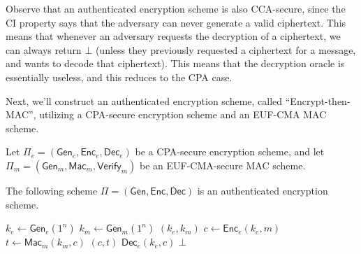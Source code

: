 \documentclass[12pt]{tufte-book}
\begin{document}
Observe that an authenticated encryption scheme is also CCA-secure, since the CI property says that the adversary can never generate a valid ciphertext. This means that whenever an adversary requests the decryption of a ciphertext, we can always return $\bot$ (unless they previously requested a ciphertext for a message, and wants to decode that ciphertext). This means that the decryption oracle is essentially useless, and this reduces to the CPA case.

Next, we'll construct an authenticated encryption scheme, called ``Encrypt-then-MAC'', utilizing a CPA-secure encryption scheme and an EUF-CMA MAC scheme.

\begin{claim}
    Let $\Pi_e = (\mathsf{Gen}_e, \mathsf{Enc}_e, \mathsf{Dec}_e)$ be a CPA-secure encryption scheme, and let $\Pi_m = (\mathsf{Gen}_m, \mathsf{Mac}_m, \mathsf{Verify}_m)$ be an EUF-CMA-secure MAC scheme.

    The following scheme $\Pi = (\mathsf{Gen}, \mathsf{Enc}, \mathsf{Dec})$ is an authenticated encryption scheme.

    \begin{algorithmic}[1]
            \State $k_e \gets \mathsf{Gen}_e(1^n)$
            \State $k_m \gets \mathsf{Gen}_m(1^n)$
            \State \Return $(k_e, k_m)$
        \EndFunction
        \Statex
            \State $c \gets \mathsf{Enc}_e(k_e, m)$
            \State $t \gets \mathsf{Mac}_m(k_m, c)$
            \State \Return $(c, t)$
        \EndFunction
        \Statex
                \State \Return $\mathsf{Dec}_e(k_e, c)$
            \Else
                \State \Return $\bot$
            \EndIf 
        \EndFunction
    \end{algorithmic}
\end{claim}
\end{document}
